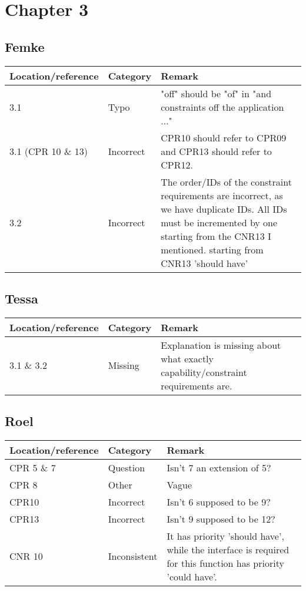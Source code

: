 \section{Chapter 3}
\subsection*{Femke}

\begin{tabular}{l|l|p{}}
Location/reference & Category & Remark\\
\hline
\hline
3.1 & Typo & "off" should be "of" in "and constraints off the application ..."\\
3.1 (CPR 10 \& 13) & Incorrect & CPR10 should refer to CPR09 and CPR13 should refer to CPR12.\\
3.2 & Incorrect & The order/IDs of the constraint requirements are incorrect, as we have duplicate IDs. All IDs must be incremented by one starting from the CNR13 I mentioned.
starting from CNR13 'should have'\\

\end{tabular}

\subsection*{Tessa}

\begin{tabular}{l|l|p{}}
Location/reference & Category & Remark\\
\hline
\hline
3.1 \& 3.2 & Missing & Explanation is missing about what exactly capability/constraint requirements are.\\
\end{tabular}

\subsection*{Roel}

\begin{tabular}{l|l|p{}}
Location/reference & Category & Remark\\
\hline
\hline
CPR 5 \& 7 & Question & Isn't 7 an extension of 5?\\
CPR 8 & Other & Vague\\
CPR10 & Incorrect & Isn't 6 supposed to be 9?\\
CPR13 & Incorrect & Isn't 9 supposed to be 12?\\
CNR 10 & Inconsistent & It has priority 'should have', while the interface is required for this function has priority 'could have'.\\
\end{tabular}

